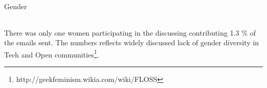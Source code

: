 \protect\hypertarget{anchor-20}{}{}Gender

\begin{longtable}[]{@{}@{}}
\toprule
\tabularnewline
\tabularnewline
\tabularnewline
\tabularnewline
\bottomrule
\end{longtable}

There was only one women participating in the discussing contributing
1.3 \% of the emails sent. The numbers reflects widely discussed lack of
gender diversity in Tech and Open communities\footnote{http://geekfeminism.wikia.com/wiki/FLOSS}.

